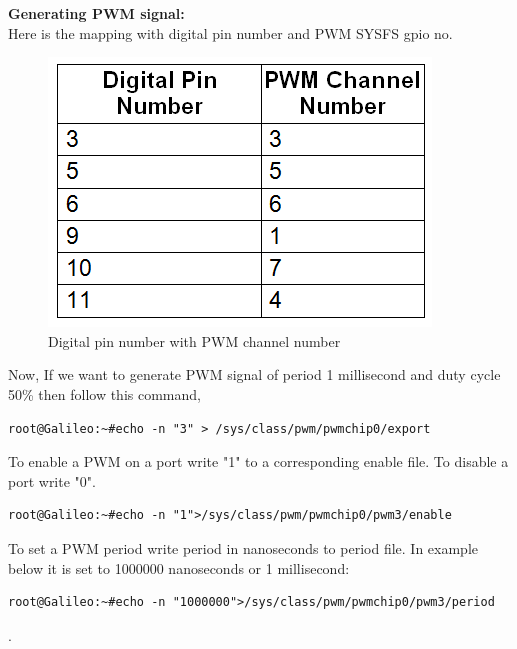 \documentclass[11pt,a4paper]{article}
\begin{document}
\vspace{.3cm}
\large{\textbf{Generating PWM signal:}}
\vspace{.1cm}\\
Here is the mapping with digital pin number and PWM SYSFS gpio no.\\
\vspace{.3cm}
\begin{figure}
	\includegraphics[width=\linewidth]{11.png}
    \caption{Digital pin number with PWM channel number}
    \end{figure}
    \vspace{.3cm}
    Now, If we want to generate PWM signal of period 1 millisecond and duty cycle 50\% then follow this command,
    \vspace{.3cm}
\begin{lstlisting}
root@Galileo:~#echo -n "3" > /sys/class/pwm/pwmchip0/export
\end{lstlisting}
To enable a PWM on a port write "1" to a corresponding enable file. To disable a port write "0".\\

\begin{lstlisting}
root@Galileo:~#echo -n "1">/sys/class/pwm/pwmchip0/pwm3/enable
\end{lstlisting}
To set a PWM period write period in nanoseconds to period file. In example below it is set to 1000000 nanoseconds or 1 millisecond:\\
\begin{lstlisting}
root@Galileo:~#echo -n "1000000">/sys/class/pwm/pwmchip0/pwm3/period
\end{lstlisting}.
\end{document}
